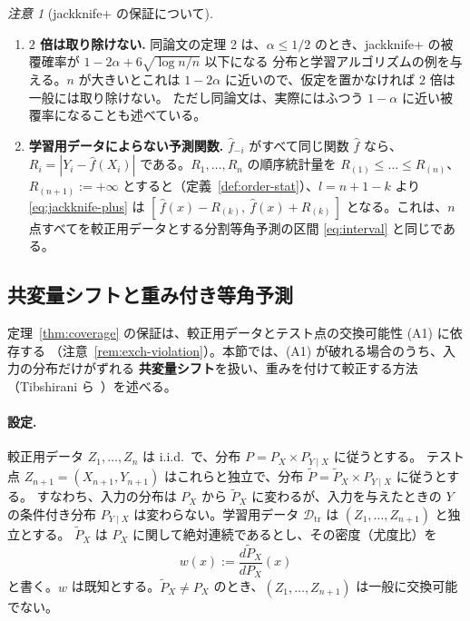 \documentclass[a4paper,11pt]{jsarticle}
\theoremstyle{definition}
\theoremstyle{plain}
\theoremstyle{remark}
\newtheorem{remark}[definition]{注意}
\newcommand{\Dtr}{\mathcal{D}_{\mathrm{tr}}}     %
\newcommand{\fhat}{\hat{f}}
\begin{document}
\begin{remark}[jackknife+ の保証について]
  \label{rem:jackknife-plus}
  \leavevmode
  \begin{enumerate}
    \item \textbf{$2$ 倍は取り除けない.}
      同論文の定理 2 は、$\alpha\le1/2$ のとき、jackknife+ の被覆確率が $1-2\alpha+6\sqrt{\log n/n}$ 以下になる
      分布と学習アルゴリズムの例を与える。$n$ が大きいとこれは $1-2\alpha$ に近いので、仮定を置かなければ $2$ 倍は一般には取り除けない。
      ただし同論文は、実際にはふつう $1-\alpha$ に近い被覆率になることも述べている。
    \item \textbf{学習用データによらない予測関数.}
      $\fhat_{-i}$ がすべて同じ関数 $\fhat$ なら、$R_i=|Y_i-\fhat(X_i)|$ である。$R_1,\dots,R_n$ の順序統計量を
      $R_{(1)}\le\dots\le R_{(n)}$、$R_{(n+1)}:=+\infty$ とすると（定義~\ref{def:order-stat}）、$l=n+1-k$ より \eqref{eq:jackknife-plus} は
      $[\,\fhat(x)-R_{(k)},\ \fhat(x)+R_{(k)}\,]$ となる。これは、$n$ 点すべてを較正用データとする分割等角予測の区間
      \eqref{eq:interval} と同じである。
  \end{enumerate}
\end{remark}

\subsection{共変量シフトと重み付き等角予測}
\label{sec:covariate-shift}

定理~\ref{thm:coverage} の保証は、較正用データとテスト点の交換可能性 (A1) に依存する
（注意~\ref{rem:exch-violation}）。本節では、(A1) が破れる場合のうち、入力の分布だけがずれる
\textbf{共変量シフト}を扱い、重みを付けて較正する方法（Tibshirani ら~\cite{tibshirani2019covariate}）を述べる。

\paragraph{設定.}
較正用データ $Z_1,\dots,Z_n$ は i.i.d.\ で、分布 $P=P_X\times P_{Y\mid X}$ に従うとする。
テスト点 $Z_{n+1}=(X_{n+1},Y_{n+1})$ はこれらと独立で、分布 $\tilde P=\tilde P_X\times P_{Y\mid X}$ に従うとする。
すなわち、入力の分布は $P_X$ から $\tilde P_X$ に変わるが、入力を与えたときの $Y$ の条件付き分布
$P_{Y\mid X}$ は変わらない。学習用データ $\Dtr$ は $(Z_1,\dots,Z_{n+1})$ と独立とする。
$\tilde P_X$ は $P_X$ に関して絶対連続であるとし、その密度（尤度比）を
\begin{equation}
  \label{eq:likelihood-ratio}
  w(x):=\frac{d\tilde P_X}{dP_X}(x)
\end{equation}
と書く。$w$ は既知とする。$\tilde P_X\ne P_X$ のとき、$(Z_1,\dots,Z_{n+1})$ は一般に交換可能でない。
\end{document}
